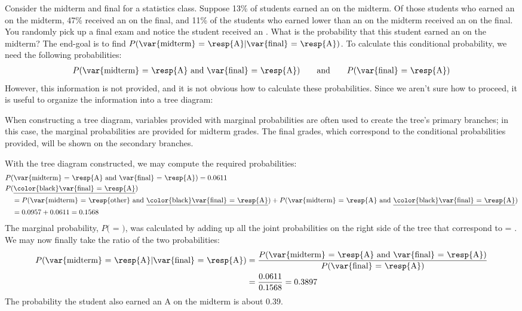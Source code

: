 \begin{examplewrap}
\begin{nexample}{Consider the midterm and final for a statistics class. Suppose 13\% of students earned an  on the midterm. Of those students who earned an  on the midterm, 47\% received an  on the final, and 11\% of the students who earned lower than an  on the midterm received an  on the final. You randomly pick up a final exam and notice the student received an . What is the probability that this student earned an  on the midterm?} \label{exerciseForTreeDiagramOfStudentGettingAOnMidtermGivenThatSheGotAOnFinal}
The end-goal is to find $P(\text{\var{midterm} = \resp{A}} | \text{\var{final} = \resp{A}})$. To calculate this conditional probability, we need the following probabilities:
\begin{align*}
P(\text{\var{midterm} = \resp{A} and \var{final} = \resp{A}})
  \qquad\text{and}\qquad
  P(\text{\var{final} = \resp{A}})
\end{align*}
However, this information is not provided, and it is not obvious how to calculate these probabilities. Since we aren't sure how to proceed, it is useful to organize the information into a tree diagram:
\begin{center}
\end{center}
When constructing a tree diagram, variables provided with marginal probabilities are often used to create the tree's primary branches; in this case, the marginal probabilities are provided for midterm grades. The final grades, which correspond to the conditional probabilities provided, will be shown on the secondary branches.

With the tree diagram constructed, we may compute the required probabilities:
\begin{align*}
&P(\text{\var{midterm} = \resp{A} and \var{final} = \resp{A}}) = 0.0611 \\
&P(\text{\underline{\color{black}\var{final} = \resp{A}}})  \\
& \quad= P(\text{\var{midterm} = \resp{other} and \underline{\color{black}\var{final} = \resp{A}}}) + P(\text{\var{midterm} = \resp{A} and \underline{\color{black}\var{final} = \resp{A}}}) \\
& \quad= 0.0957 + 0.0611  = 0.1568
\end{align*}
The marginal probability, $P($ = $)$, was calculated by adding up all the joint probabilities on the right side of the tree that correspond to  = . We may now finally take the ratio of the two probabilities:
\begin{align*}
P(\text{\var{midterm} = \resp{A}} | \text{\var{final} = \resp{A}})
  &= \frac{P(\text{\var{midterm} = \resp{A}
      and \var{final} = \resp{A}})}
    {P(\text{\var{final} = \resp{A}})} \\
  &= \frac{0.0611}{0.1568} = 0.3897
\end{align*}
The probability the student also earned an A on the midterm is about 0.39.
\end{nexample}
\end{examplewrap}


